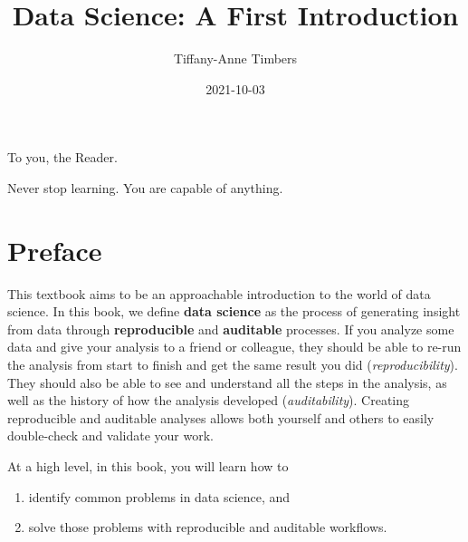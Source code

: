 \documentclass[
  12pt,
]{krantz}
\title{Data Science: A First Introduction}
\author{Tiffany-Anne Timbers}
\date{2021-10-03}
\providecommand{\tightlist}{%
  \setlength{\itemsep}{0pt}\setlength{\parskip}{0pt}}
\begin{document}
\maketitle


\thispagestyle{empty}

\begin{center}
To you, the Reader.

Never stop learning. You are capable of anything.
\end{center}

\setlength{\abovedisplayskip}{-5pt}
\setlength{\abovedisplayshortskip}{-5pt}

{
\hypersetup{linkcolor=}
\setcounter{tocdepth}{2}
\tableofcontents
}
\listoffigures
\listoftables
\hypertarget{preface}{%
\chapter*{Preface}\label{preface}}


This textbook aims to be an approachable introduction to the world of data science.
In this book, we define \textbf{data science}  as the process of generating
insight from data through \textbf{reproducible}  and \textbf{auditable}  processes.
If you analyze some data and give your analysis to a friend or colleague, they should
be able to re-run the analysis from start to finish and get the same result you did (\emph{reproducibility}).
They should also be able to see and understand all the steps in the analysis, as well as the history of how
the analysis developed (\emph{auditability}). Creating reproducible and auditable
analyses allows both yourself and others to easily double-check and validate your work.

At a high level, in this book, you will learn how to

\begin{enumerate}
\def\labelenumi{(\arabic{enumi})}
\tightlist
\item
  identify common problems in data science, and
\item
  solve those problems with reproducible and auditable workflows.
\end{enumerate}
\end{document}
